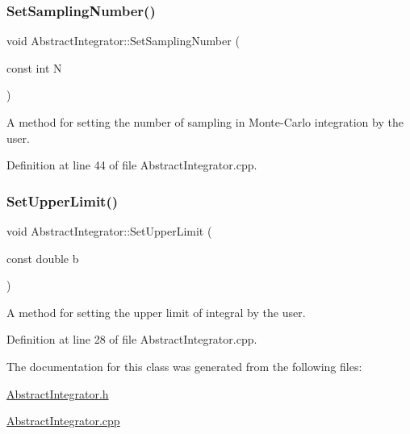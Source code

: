 \subsubsection{\texorpdfstring{Set\+Sampling\+Number()}{SetSamplingNumber()}}
{\footnotesize\ttfamily void Abstract\+Integrator\+::\+Set\+Sampling\+Number (\begin{DoxyParamCaption}\item[{const int}]{N }\end{DoxyParamCaption})}



A method for setting the number of sampling in Monte-\/\+Carlo integration by the user. 



Definition at line 44 of file Abstract\+Integrator.\+cpp.

\mbox{\label{class_abstract_integrator_a341070bf2dca9e2ac113d388e6d06556}} 
\subsubsection{\texorpdfstring{Set\+Upper\+Limit()}{SetUpperLimit()}}
{\footnotesize\ttfamily void Abstract\+Integrator\+::\+Set\+Upper\+Limit (\begin{DoxyParamCaption}\item[{const double}]{b }\end{DoxyParamCaption})}



A method for setting the upper limit of integral by the user. 



Definition at line 28 of file Abstract\+Integrator.\+cpp.



The documentation for this class was generated from the following files\+:\begin{DoxyCompactItemize}
\item 
\hyperlink{_abstract_integrator_8h}{Abstract\+Integrator.\+h}\item 
\hyperlink{_abstract_integrator_8cpp}{Abstract\+Integrator.\+cpp}\end{DoxyCompactItemize}
